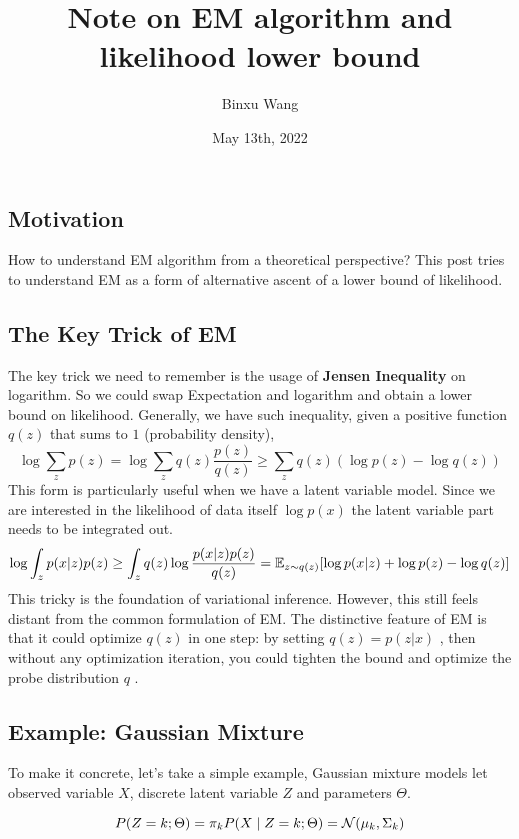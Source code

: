 \documentclass[
]{article}
\title{Note on EM algorithm and likelihood lower bound}
\author{Binxu Wang}
\date{May 13th, 2022}
\begin{document}
\maketitle

\subsection{Motivation}

How to understand EM algorithm from a theoretical perspective? This post
tries to understand EM as a form of alternative ascent of a lower bound
of likelihood.

\subsection{The Key Trick of EM}

The key trick we need to remember is the usage of \textbf{Jensen
Inequality} on logarithm. So we could swap Expectation and logarithm and
obtain a lower bound on likelihood. Generally, we have such inequality,
given a positive function \(q(z)\) that sums to \(1\) (probability
density), \[
\log \sum_z p(z)=\log \sum_zq(z)\frac{p(z)}{q(z)}\geq \sum_zq(z) (\log p(z)-\log q(z))
\] This form is particularly useful when we have a latent variable
model. Since we are interested in the likelihood of data itself
\(\log p(x)\) the latent variable part needs to be integrated out. \[
\log \int_zp(x|z)p(z) \geq \int_z q(z)\log\frac{p(x|z)p(z)}{q(z)}\\
=\mathbb E_{z\sim q(z)} [\log p(x|z) + \log p(z) - \log q(z)]
\] This tricky is the foundation of variational inference. However, this
still feels distant from the common formulation of EM. The distinctive
feature of EM is that it could optimize \(q(z)\) in one step: by setting
\(q(z)=p(z|x)\) , then without any optimization iteration, you could
tighten the bound and optimize the probe distribution \(q\) .

\subsection{Example: Gaussian Mixture}

To make it concrete, let's take a simple example, Gaussian mixture
models let observed variable \(X\), discrete latent variable \(Z\) and
parameters \(\Theta\).

\[
P(Z=k;\Theta)=\pi_k\\
P(X\mid Z=k;\Theta)=\mathcal N(\mu_k,\Sigma_k)
\]
\end{document}
